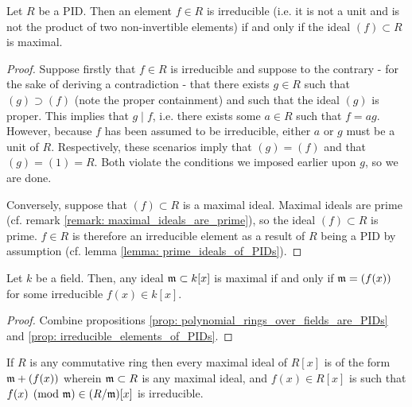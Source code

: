         \begin{proposition} \label{prop: irreducible_elements_of_PIDs}
            Let $R$ be a PID. Then an element $f \in R$ is irreducible (i.e. it is not a unit and is not the product of two non-invertible elements) if and only if the ideal $(f) \subset R$ is maximal.
        \end{proposition}
            \begin{proof}
                Suppose firstly that $f \in R$ is irreducible and suppose to the contrary - for the sake of deriving a contradiction - that there exists $g \in R$ such that $(g) \supset (f)$ (note the proper containment) and such that the ideal $(g)$ is proper. This implies that $g \mid f$, i.e. there exists some $a \in R$ such that $f = ag$. However, because $f$ has been assumed to be irreducible, either $a$ or $g$ must be a unit of $R$. Respectively, these scenarios imply that $(g) = (f)$ and that $(g) = (1) = R$. Both violate the conditions we imposed earlier upon $g$, so we are done.
                
                Conversely, suppose that $(f) \subset R$ is a maximal ideal. Maximal ideals are prime (cf. remark \ref{remark: maximal_ideals_are_prime}), so the ideal $(f) \subset R$ is prime. $f \in R$ is therefore an irreducible element as a result of $R$ being a PID by assumption (cf. lemma \ref{lemma: prime_ideals_of_PIDs}). 
            \end{proof}
        \begin{corollary} \label{coro: maximal_ideals_of_polynomial_rings_over_fields}
            Let $k$ be a field. Then, any ideal $\mathfrak{m} \subset k[x]$ is maximal if and only if $\mathfrak{m} = (f(x))$ for some irreducible $f(x) \in k[x]$.
        \end{corollary}
            \begin{proof}
                Combine propositions \ref{prop: polynomial_rings_over_fields_are_PIDs} and \ref{prop: irreducible_elements_of_PIDs}.
            \end{proof}
        \begin{theorem} \label{theorem: maximal_ideals_of_polynomial_rings_over_commutative_rings}
            If $R$ is any commutative ring then every maximal ideal of $R[x]$ is of the form $\mathfrak{m} + (f(x))$ wherein $\mathfrak{m} \subset R$ is any maximal ideal, and $f(x) \in R[x]$ is such that $f(x) \pmod{\mathfrak{m}} \in (R/\mathfrak{m})[x]$ is irreducible.
        \end{theorem}
